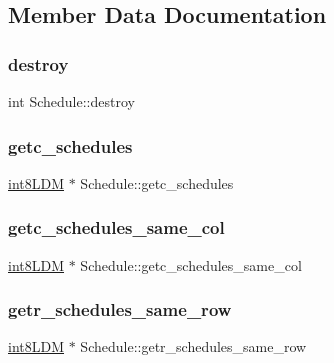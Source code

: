 \subsection{Member Data Documentation}
\mbox{\label{structSchedule_ab2823b4aae65c91dc839a8ac5e221fe2}} 
\subsubsection{\texorpdfstring{destroy}{destroy}}
{\footnotesize\ttfamily int Schedule\+::destroy}

\mbox{\label{structSchedule_a0c0f6a13e68b492a0e4c390b39ad85ef}} 
\subsubsection{\texorpdfstring{getc\_schedules}{getc\_schedules}}
{\footnotesize\ttfamily \mbox{\hyperlink{include_2RlmpiShared_8h_a69782ffde89d45e86308f10afedf08a6}{int8\+L\+DM}} $\ast$ Schedule\+::getc\+\_\+schedules}

\mbox{\label{structSchedule_a746c407eb32c955a013013b47b5b3277}} 
\subsubsection{\texorpdfstring{getc\_schedules\_same\_col}{getc\_schedules\_same\_col}}
{\footnotesize\ttfamily \mbox{\hyperlink{include_2RlmpiShared_8h_a69782ffde89d45e86308f10afedf08a6}{int8\+L\+DM}} $\ast$ Schedule\+::getc\+\_\+schedules\+\_\+same\+\_\+col}

\mbox{\label{structSchedule_a3f921de672d96641c60fc9f06e590ddb}} 
\subsubsection{\texorpdfstring{getr\_schedules\_same\_row}{getr\_schedules\_same\_row}}
{\footnotesize\ttfamily \mbox{\hyperlink{include_2RlmpiShared_8h_a69782ffde89d45e86308f10afedf08a6}{int8\+L\+DM}} $\ast$ Schedule\+::getr\+\_\+schedules\+\_\+same\+\_\+row}

